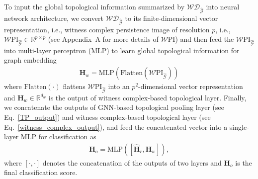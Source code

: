 \documentclass[letterpaper]{article} %
\begin{document}
To input the global topological information summarized by $\mathcal{WD}_{\mathcal{\hat{G}}}$ into neural network architecture, we convert $\mathcal{WD}_{\mathcal{\hat{G}}}$ to its finite-dimensional vector representation, i.e., witness complex persistence image of resolution $p$, i.e., $\mathcal{W}\text{PI}_{\mathcal{\hat{G}}}\in \mathbb{R}^{p \times p}$ (see Appendix~A for more details of $\mathcal{W}\text{PI}$) and then feed the $\mathcal{W}\text{PI}_{\mathcal{\hat{G}}}$ into multi-layer perceptron (MLP) to learn global topological information for graph embedding
\begin{align}
\label{witness_complex_output}
    \boldsymbol{H}_w = \text{MLP}(\text{Flatten}(\mathcal{W}\text{PI}_\mathcal{\hat{G}}))
\end{align}
where $\text{Flatten}(\cdot)$ flattens %
$\mathcal{W}\text{PI}_{\mathcal{\hat{G}}}$ into an $p^2$-dimensional vector representation and $\boldsymbol{H}_w \in \mathbb{R}^{d_w}$ is the output of witness complex-based topological layer. Finally, we concatenate the outputs of GNN-based topological pooling layer (see Eq.~\ref{TP_output}) and witness complex-based topological layer (see Eq.~\ref{witness_complex_output}), and feed the concatenated vector into a single-layer MLP for classification as
\begin{align*}
    \boldsymbol{H}_o = \text{MLP}([\boldsymbol{\hat{H}}_r, \boldsymbol{H}_w]),
\end{align*}
where $[\cdot,\cdot]$ denotes the concatenation of the outputs of two layers and $\boldsymbol{H}_o$ is the final classification score.
\end{document}

